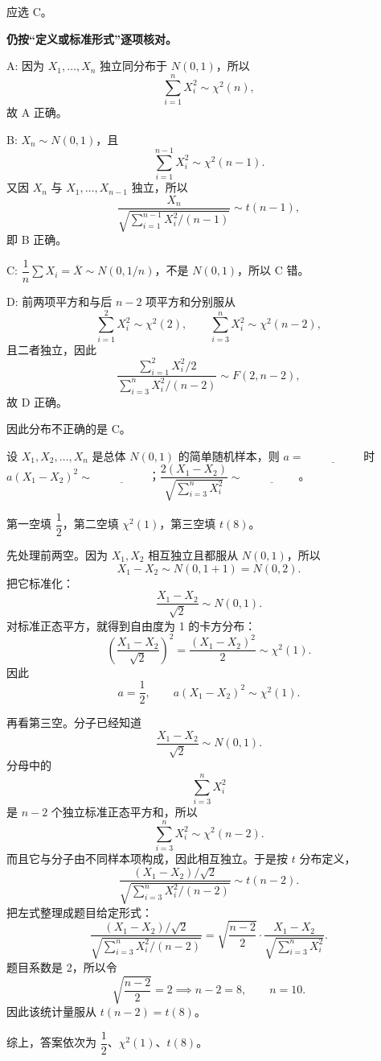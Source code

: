 ﻿\documentclass[lang=cn,11pt]{elegantbook}
\begin{document}
\begin{solution}
应选 C。

\textbf{仍按“定义或标准形式”逐项核对。}

A: 因为 \(X_1,\dots,X_n\) 独立同分布于 \(N(0,1)\)，所以
\[
\sum_{i=1}^{n}X_i^2 \sim \chi^2(n),
\]
故 A 正确。

B: \(X_n \sim N(0,1)\)，且
\[
\sum_{i=1}^{n-1}X_i^2 \sim \chi^2(n-1).
\]
又因 \(X_n\) 与 \(X_1,\dots,X_{n-1}\) 独立，所以
\[
\frac{X_n}{\sqrt{\sum_{i=1}^{n-1}X_i^2/(n-1)}} \sim t(n-1),
\]
即 B 正确。

C: \(\dfrac{1}{n}\sum X_i=\overline{X}\sim N(0,1/n)\)，不是 \(N(0,1)\)，所以 C 错。

D: 前两项平方和与后 \(n-2\) 项平方和分别服从
\[
\sum_{i=1}^{2}X_i^2\sim \chi^2(2),\qquad \sum_{i=3}^{n}X_i^2\sim \chi^2(n-2),
\]
且二者独立，因此
\[
\frac{\sum_{i=1}^{2}X_i^2/2}{\sum_{i=3}^{n}X_i^2/(n-2)} \sim F(2,n-2),
\]
故 D 正确。

因此分布不正确的是 C。
\end{solution}


\begin{exercise}\label{exer:6-multi-dist}
设 \(X_1, X_2, \dots, X_n\) 是总体 \(N(0,1)\) 的简单随机样本，则 \(a =\,\underline{\hspace{2cm}}\) 时 \(a(X_1-X_2)^2 \sim\,\underline{\hspace{2cm}}\)；\(\dfrac{2(X_1-X_2)}{\sqrt{\sum_{i=3}^{n}X_i^2}} \sim\,\underline{\hspace{2cm}}\)。
\end{exercise}
\begin{solution}
第一空填 \(\dfrac{1}{2}\)，第二空填 \(\chi^2(1)\)，第三空填 \(t(8)\)。

先处理前两空。因为 \(X_1,X_2\) 相互独立且都服从 \(N(0,1)\)，所以
\[
X_1-X_2\sim N(0,1+1)=N(0,2).
\]
把它标准化：
\[
\frac{X_1-X_2}{\sqrt2}\sim N(0,1).
\]
对标准正态平方，就得到自由度为 1 的卡方分布：
\[
\left(\frac{X_1-X_2}{\sqrt2}\right)^2=\frac{(X_1-X_2)^2}{2}\sim\chi^2(1).
\]
因此
\[
a=\frac12,\qquad a(X_1-X_2)^2\sim\chi^2(1).
\]

再看第三空。分子已经知道
\[
\frac{X_1-X_2}{\sqrt2}\sim N(0,1).
\]
分母中的
\[
\sum_{i=3}^{n}X_i^2
\]
是 \(n-2\) 个独立标准正态平方和，所以
\[
\sum_{i=3}^{n}X_i^2\sim\chi^2(n-2).
\]
而且它与分子由不同样本项构成，因此相互独立。于是按 \(t\) 分布定义，
\[
\frac{(X_1-X_2)/\sqrt2}{\sqrt{\sum_{i=3}^{n}X_i^2/(n-2)}}\sim t(n-2).
\]
把左式整理成题目给定形式：
\[
\frac{(X_1-X_2)/\sqrt2}{\sqrt{\sum_{i=3}^{n}X_i^2/(n-2)}}
=\sqrt{\frac{n-2}{2}}\cdot\frac{X_1-X_2}{\sqrt{\sum_{i=3}^{n}X_i^2}}.
\]
题目系数是 2，所以令
\[
\sqrt{\frac{n-2}{2}}=2 \implies n-2=8,\qquad n=10.
\]
因此该统计量服从 \(t(n-2)=t(8)\)。

综上，答案依次为 \(\dfrac12\)、\(\chi^2(1)\)、\(t(8)\)。
\end{solution}
\end{document}
